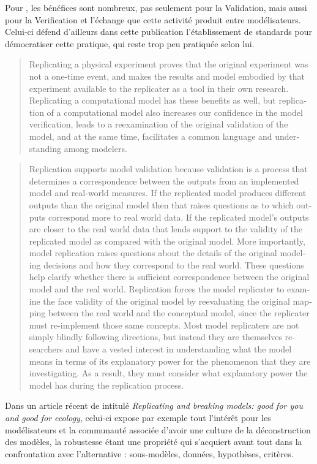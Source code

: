 Pour \textcite{Wilensky2007a}, les bénéfices sont nombreux, pas seulement pour la Validation, mais aussi pour la Verification  et l'échange que cette activité produit entre modélisateurs. Celui-ci défend d'ailleurs dans cette publication l'établissement de standards pour démocratiser cette pratique, qui reste trop peu pratiquée selon lui.

\foreignblockquote{english}[\cite{Wilensky2007a}]{Replicating a physical experiment proves that the original experiment was not a one-time event, and makes the results and model embodied by that experiment available to the replicater as a tool in their own research. Replicating a computational model has these benefits as well, but replication of a computational model also increases our confidence in the model verification, leads to a reexamination of the original validation of the model, and at the same time, facilitates a common language and understanding among modelers.}

\foreignblockquote{english}[\cite{Wilensky2007a}]{Replication supports model validation because validation is a process that determines a correspondence between the outputs from an implemented model and real-world measures. If the replicated model produces different outputs than the original model then that raises questions as to which outputs correspond more to real world data. If the replicated model's outputs are closer to the real world data that lends support to the validity of the replicated model as compared with the original model. More importantly, model replication raises questions about the details of the original modeling decisions and how they correspond to the real world. These questions help clarify whether there is sufficient correspondence between the original model and the real world. Replication forces the model replicater to examine the face validity of the original model by reevaluating the original mapping between the real world and the conceptual model, since the replicater must re-implement those same concepts. Most model replicaters are not simply blindly following directions, but instead they are themselves researchers and have a vested interest in understanding what the model means in terms of its explanatory power for the phenomenon that they are investigating. As a result, they must consider what explanatory power the model has during the replication process.}

Dans un article récent de \textcite{Thiele2015} intitulé \textit{Replicating and breaking models: good for you and good for ecology}, celui-ci expose par exemple tout l'intérêt pour les modélisateurs et la communauté associée d'avoir une culture de la déconstruction des modèles, la robustesse étant une propriété qui s'acquiert avant tout dans la confrontation avec l'alternative : sous-modèles, données, hypothèses, critères.

